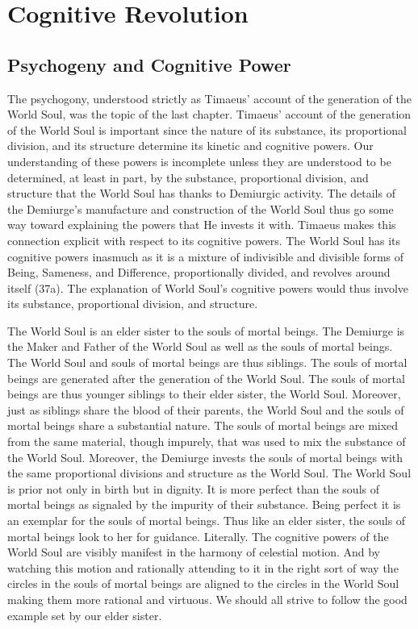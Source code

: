 
\chapter{Cognitive Revolution} %
\label{cha:cognitive_revolution}

\section{Psychogeny and Cognitive Power} %
\label{sec:psychogony_and_psychic_power}

The psychogony, understood strictly as Timaeus' account of the generation of the World Soul, was the topic of the last chapter. Timaeus' account of the generation of the World Soul is important since the nature of its substance, its proportional division, and its structure determine its kinetic and cognitive powers. Our understanding of these powers is incomplete unless they are understood to be determined, at least in part, by the substance, proportional division, and structure that the World Soul has thanks to Demiurgic activity. The details of the Demiurge's manufacture and construction of the World Soul thus go some way toward explaining the powers that He invests it with. Timaeus makes this connection explicit with respect to its cognitive powers. The World Soul has its cognitive powers inasmuch as it is a mixture of indivisible and divisible forms of Being, Sameness, and Difference, proportionally divided, and revolves around itself (37a). The explanation of World Soul's cognitive powers would thus involve its substance, proportional division, and structure.

The World Soul is an elder sister to the souls of mortal beings. The Demiurge is the Maker and Father of the World Soul as well as the souls of mortal beings. The World Soul and souls of mortal beings are thus siblings. The souls of mortal beings are generated after the generation of the World Soul. The souls of mortal beings are thus younger siblings to their elder sister, the World Soul. Moreover, just as siblings share the blood of their parents, the World Soul and the souls of mortal beings share a substantial nature. The souls of mortal beings are mixed from the same material, though impurely, that was used to mix the substance of the World Soul. Moreover, the Demiurge invests the souls of mortal beings with the same proportional divisions and structure as the World Soul. The World Soul is prior not only in birth but in dignity. It is more perfect than the souls of mortal beings as signaled by the impurity of their substance. Being perfect it is an exemplar for the souls of mortal beings. Thus like an elder sister, the souls of mortal beings look to her for guidance. Literally. The cognitive powers of the World Soul are visibly manifest in the harmony of celestial motion. And by watching this motion and rationally attending to it in the right sort of way the circles in the souls of mortal beings are aligned to the circles in the World Soul making them more rational and virtuous. We should all strive to follow the good example set by our elder sister.

